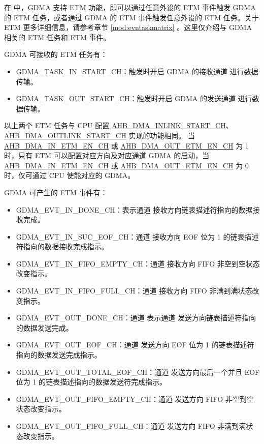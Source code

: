\documentclass[main\_\_CN.tex]{subfiles}
\begin{document}
在 \chipname{} 中，GDMA 支持 ETM 功能，即可以通过任意外设的 ETM 事件触发 GDMA 的 ETM 任务，或者通过 GDMA 的 ETM 事件触发任意外设的 ETM 任务。关于 ETM 更多详细信息，请参考章节 \ref{mod:evntaskmatrix} 。这里仅介绍与 GDMA 相关的 ETM 任务和 ETM 事件。


GDMA 可接收的 ETM 任务有：

\begin{itemize}
\item GDMA\_TASK\_IN\_START\_CH：触发时开启 GDMA 的接收通道  进行数据传输。
\item GDMA\_TASK\_OUT\_START\_CH：触发时开启 GDMA 的发送通道  进行数据传输。
\end{itemize}

\begin{tiplisting}
以上两个 ETM 任务与 CPU 配置 \hyperref[fielddesc:AHBDMAINLINKSTARTCHN]{AHB\_DMA\_INLINK\_START\_CH}、\hyperref[fielddesc:AHBDMAOUTLINKSTARTCHN]{AHB\_DMA\_OUTLINK\_START\_CH} 实现的功能相同。 当 \hyperref[fielddesc:AHBDMAINETMENCHN]{AHB\_DMA\_IN\_ETM\_EN\_CH} 或 \hyperref[fielddesc:AHBDMAOUTETMENCHN]{AHB\_DMA\_OUT\_ETM\_EN\_CH} 为 1 时，只有 ETM 可以配置对应方向及对应通道 GDMA 的启动，当 \hyperref[fielddesc:AHBDMAINETMENCHN]{AHB\_DMA\_IN\_ETM\_EN\_CH} 或 \hyperref[fielddesc:AHBDMAOUTETMENCHN]{AHB\_DMA\_OUT\_ETM\_EN\_CH} 为 0 时，仅可通过 CPU 使能对应的 GDMA。
\end{tiplisting}

GDMA 可产生的 ETM 事件有：

\begin{itemize}
\item GDMA\_EVT\_IN\_DONE\_CH：表示通道  接收方向链表描述符指向的数据接收完成。
\item GDMA\_EVT\_IN\_SUC\_EOF\_CH：通道  接收方向 EOF 位为 1 的链表描述符指向的数据接收完成指示。
\item GDMA\_EVT\_IN\_FIFO\_EMPTY\_CH：通道  接收方向 FIFO 非空到空状态改变指示。
\item GDMA\_EVT\_IN\_FIFO\_FULL\_CH：通道  接收方向 FIFO 非满到满状态改变指示。
\item GDMA\_EVT\_OUT\_DONE\_CH：通道  表示通道  发送方向链表描述符指向的数据发送完成。
\item GDMA\_EVT\_OUT\_EOF\_CH：通道  发送方向 EOF 位为 1 的链表描述符指向的数据发送完成指示。
\item GDMA\_EVT\_OUT\_TOTAL\_EOF\_CH：通道  发送方向最后一个并且 EOF 位为 1 的链表描述指向的数据发送符完成指示。
\item GDMA\_EVT\_OUT\_FIFO\_EMPTY\_CH：通道  发送方向 FIFO 非空到空状态改变指示。
\item GDMA\_EVT\_OUT\_FIFO\_FULL\_CH：通道  发送方向 FIFO 非满到满状态改变指示。
\end{itemize}
\end{document}
